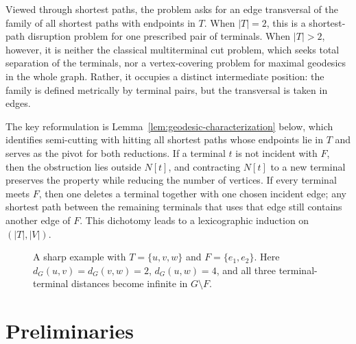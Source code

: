 \documentclass[11pt,a4paper]{amsart}
\theoremstyle{definition}
\theoremstyle{plain}
\newcommand{\dist}[3]{d_{#1}(#2,#3)}
\begin{document}
Viewed through shortest paths, the problem asks for an edge transversal of the family of all shortest paths with endpoints in $T$. When $|T|=2$, this is a shortest-path disruption problem for one prescribed pair of terminals. When $|T|>2$, however, it is neither the classical multiterminal cut problem, which seeks total separation of the terminals, nor a vertex-covering problem for maximal geodesics in the whole graph. Rather, it occupies a distinct intermediate position: the family is defined metrically by terminal pairs, but the transversal is taken in edges.

The key reformulation is Lemma~\ref{lem:geodesic-characterization} below, which identifies semi-cutting with hitting all shortest paths whose endpoints lie in $T$ and serves as the pivot for both reductions. If a terminal $t$ is not incident with $F$, then the obstruction lies outside $N[t]$, and contracting $N[t]$ to a new terminal preserves the property while reducing the number of vertices. If every terminal meets $F$, then one deletes a terminal together with one chosen incident edge; any shortest path between the remaining terminals that uses that edge still contains another edge of $F$. This dichotomy leads to a lexicographic induction on $(|T|,|V|)$.

\begin{figure}[htbp]
\centering
{}
\caption{A sharp example with $T=\{u,v,w\}$ and $F=\{e_1,e_2\}$. Here $\dist{G}{u}{v}=\dist{G}{v}{w}=2$, $\dist{G}{u}{w}=4$, and all three terminal-terminal distances become infinite in $G\setminus F$.}
\label{fig:semi-cut-example}
\end{figure}

\section{Preliminaries}
\end{document}
